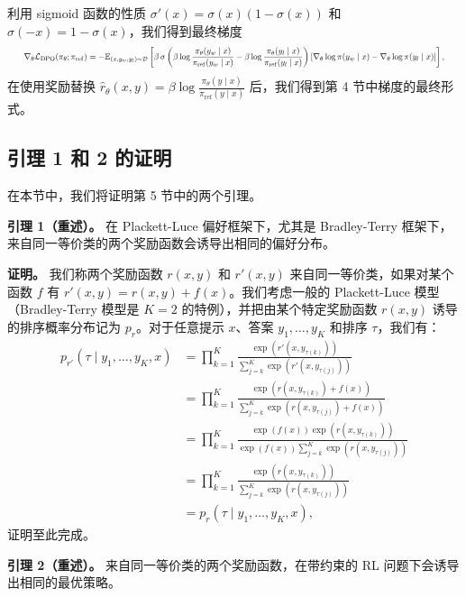 \documentclass[11pt,UTF8,fontset=fandol]{ctexart}
\newcommand{\sref}{\mathrm{ref}}
\begin{document}
利用 sigmoid 函数的性质 $\sigma'(x) = \sigma(x)(1 - \sigma(x))$ 和 $\sigma(-x) = 1 - \sigma(x)$，我们得到最终梯度
\[
\resizebox{0.97\linewidth}{!}{$\displaystyle
\nabla_\theta \mathcal{L}_{\mathrm{DPO}}(\pi_\theta; \pi_\sref) = -\mathbb{E}_{(x, y_w, y_l) \sim \mathcal{D}}\left[\beta\, \sigma\left(\beta \log \frac{\pi_\theta(y_w \mid x)}{\pi_\sref(y_w \mid x)} - \beta \log \frac{\pi_\theta(y_l \mid x)}{\pi_\sref(y_l \mid x)}\right)\left[\nabla_\theta \log \pi(y_w \mid x) - \nabla_\theta \log \pi(y_l \mid x)\right]\right],
$}
\]
在使用奖励替换 $\hat{r}_\theta(x, y) = \beta \log \frac{\pi_\theta(y \mid x)}{\pi_\sref(y \mid x)}$ 后，我们得到第 4 节中梯度的最终形式。

\subsection{引理 1 和 2 的证明}

在本节中，我们将证明第 5 节中的两个引理。

\textbf{引理 1（重述）。} 在 Plackett-Luce 偏好框架下，尤其是 Bradley-Terry 框架下，来自同一等价类的两个奖励函数会诱导出相同的偏好分布。

\textbf{证明。} 我们称两个奖励函数 $r(x, y)$ 和 $r'(x, y)$ 来自同一等价类，如果对某个函数 $f$ 有 $r'(x, y) = r(x, y) + f(x)$。我们考虑一般的 Plackett-Luce 模型（Bradley-Terry 模型是 $K = 2$ 的特例），并把由某个特定奖励函数 $r(x, y)$ 诱导的排序概率分布记为 $p_r$。对于任意提示 $x$、答案 $y_1, \ldots, y_K$ 和排序 $\tau$，我们有：
\[
\begin{aligned}
p_{r'}(\tau \mid y_1, \ldots, y_K, x) &= \prod_{k=1}^{K} \frac{\exp\left(r'(x, y_{\tau(k)})\right)}{\sum_{j=k}^{K} \exp\left(r'(x, y_{\tau(j)})\right)} \\
&= \prod_{k=1}^{K} \frac{\exp\left(r(x, y_{\tau(k)}) + f(x)\right)}{\sum_{j=k}^{K} \exp\left(r(x, y_{\tau(j)}) + f(x)\right)} \\
&= \prod_{k=1}^{K} \frac{\exp(f(x)) \exp\left(r(x, y_{\tau(k)})\right)}{\exp(f(x)) \sum_{j=k}^{K} \exp\left(r(x, y_{\tau(j)})\right)} \\
&= \prod_{k=1}^{K} \frac{\exp\left(r(x, y_{\tau(k)})\right)}{\sum_{j=k}^{K} \exp\left(r(x, y_{\tau(j)})\right)} \\
&= p_r(\tau \mid y_1, \ldots, y_K, x),
\end{aligned}
\]
证明至此完成。

\textbf{引理 2（重述）。} 来自同一等价类的两个奖励函数，在带约束的 RL 问题下会诱导出相同的最优策略。
\end{document}
